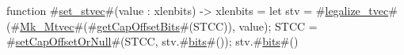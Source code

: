 function #\hyperref[sailRISCVzsetzystvec]{set\_stvec}#(value : xlenbits) -> xlenbits = {
  let stv = #\hyperref[sailRISCVzlegalizzezytvec]{legalize\_tvec}#(#\hyperref[sailRISCVzMkzyMtvec]{Mk\_Mtvec}#(#\hyperref[sailRISCVzgetCapOffsetBits]{getCapOffsetBits}#(STCC)), value);
  STCC = #\hyperref[sailRISCVzsetCapOffsetOrNull]{setCapOffsetOrNull}#(STCC, stv.#\hyperref[sailRISCVzbits]{bits}#());
  stv.#\hyperref[sailRISCVzbits]{bits}#()
}
